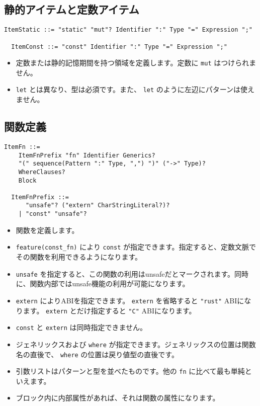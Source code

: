 \documentclass[dvipdfmx,uplatex,papersize,a4paper,10pt]{jsbook}
\theoremstyle{definition}
\begin{document}
\subsection{静的アイテムと定数アイテム}

\begin{lstlisting}[language=BNFLike, gobble=2]
  ItemStatic ::= "static" "mut"? Identifier ":" Type "=" Expression ";"

  ItemConst ::= "const" Identifier ":" Type "=" Expression ";"
\end{lstlisting}

\begin{itemize}
  \item 定数または静的記憶期間を持つ領域を定義します。定数に \verb|mut| はつけられません。
  \item \verb|let| とは異なり、型は必須です。また、 \verb|let| のように左辺にパターンは使えません。
\end{itemize}

\subsection{関数定義}

\begin{lstlisting}[language=BNFLike, gobble=2]
  ItemFn ::=
    ItemFnPrefix "fn" Identifier Generics?
    "(" sequence(Pattern ":" Type, ",") ")" ("->" Type)?
    WhereClauses?
    Block

  ItemFnPrefix ::=
      "unsafe"? ("extern" CharStringLiteral?)?
    | "const" "unsafe"?
\end{lstlisting}

\begin{itemize}
  \item 関数を定義します。
  \item \verb|feature(const_fn)| により \verb|const| が指定できます。指定すると、定数文脈でその関数を利用できるようになります。
  \item \verb|unsafe| を指定すると、この関数の利用はunsafeだとマークされます。同時に、関数内部ではunsafe機能の利用が可能になります。
  \item \verb|extern| によりABIを指定できます。 \verb|extern| を省略すると \verb|"rust"| ABIになります。 \verb|extern| とだけ指定すると \verb|"C"| ABIになります。
  \item \verb|const| と \verb|extern| は同時指定できません。
  \item ジェネリックスおよび \verb|where| が指定できます。ジェネリックスの位置は関数名の直後で、 \verb|where| の位置は戻り値型の直後です。
  \item 引数リストはパターンと型を並べたものです。他の \verb|fn| に比べて最も単純といえます。
  \item ブロック内に内部属性があれば、それは関数の属性になります。
\end{itemize}
\end{document}

